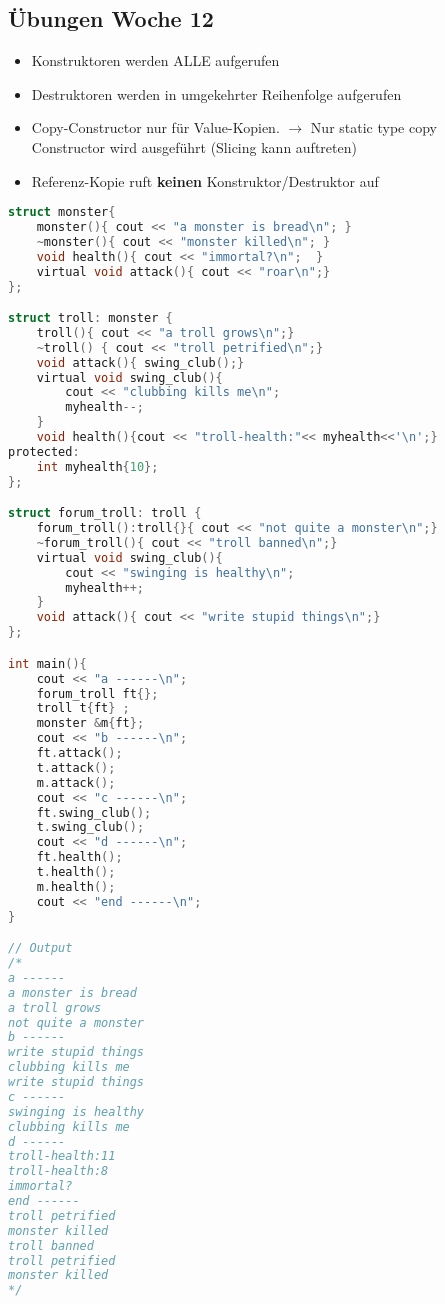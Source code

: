 
\subsection{Übungen Woche 12}
\begin{itemize}
	\item Konstruktoren werden ALLE aufgerufen
	\item Destruktoren werden in umgekehrter Reihenfolge aufgerufen
	\item Copy-Constructor nur für Value-Kopien. $\rightarrow$ Nur static type copy Constructor wird ausgeführt (Slicing kann auftreten)
	\item Referenz-Kopie ruft \textbf{keinen} Konstruktor/Destruktor auf
\end{itemize}

\begin{lstlisting}[style=frame, style= linenumbers, language=C]
struct monster{
	monster(){ cout << "a monster is bread\n"; }
	~monster(){ cout << "monster killed\n"; }
	void health(){ cout << "immortal?\n";  }
	virtual void attack(){ cout << "roar\n";}
};

struct troll: monster {
	troll(){ cout << "a troll grows\n";}
	~troll() { cout << "troll petrified\n";}
	void attack(){ swing_club();}
	virtual void swing_club(){
		cout << "clubbing kills me\n";
		myhealth--;
	}
	void health(){cout << "troll-health:"<< myhealth<<'\n';}
protected:
	int myhealth{10};
};

struct forum_troll: troll {
	forum_troll():troll{}{ cout << "not quite a monster\n";}
	~forum_troll(){ cout << "troll banned\n";}
	virtual void swing_club(){
		cout << "swinging is healthy\n";
		myhealth++;
	}
	void attack(){ cout << "write stupid things\n";}
};

int main(){
	cout << "a ------\n";
	forum_troll ft{};
	troll t{ft} ;
	monster &m{ft};
	cout << "b ------\n";
	ft.attack();
	t.attack();
	m.attack();
	cout << "c ------\n";
	ft.swing_club();
	t.swing_club();
	cout << "d ------\n";
	ft.health();
	t.health();
	m.health();
	cout << "end ------\n";
}

// Output
/*
a ------
a monster is bread
a troll grows
not quite a monster
b ------
write stupid things
clubbing kills me
write stupid things
c ------
swinging is healthy
clubbing kills me
d ------
troll-health:11
troll-health:8
immortal?
end ------
troll petrified
monster killed
troll banned
troll petrified
monster killed
*/

\end{lstlisting}